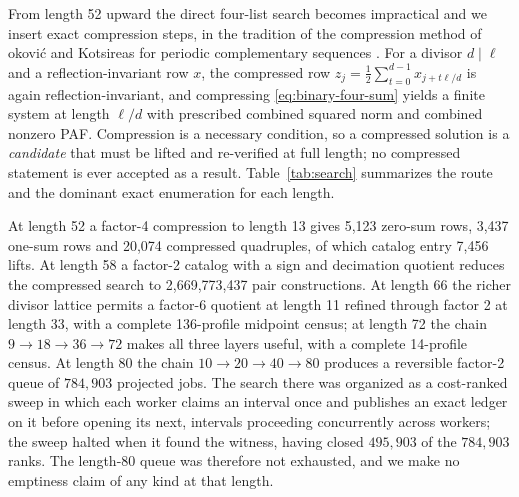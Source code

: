 \documentclass[11pt]{article}
\begin{document}
From length 52 upward the direct four-list search becomes impractical and we
insert exact compression steps, in the tradition of the compression method of
{\DJ}okovi{\'c} and Kotsireas for periodic complementary sequences
\cite{dokovic-kotsireas-2015}.  For a divisor $d\mid\ell$ and a
reflection-invariant row $x$, the compressed row
$z_j=\tfrac12\sum_{t=0}^{d-1}x_{j+t\ell/d}$ is again reflection-invariant,
and compressing \eqref{eq:binary-four-sum} yields a finite system at length
$\ell/d$ with prescribed combined squared norm and combined nonzero PAF.
Compression is a necessary condition, so a compressed solution is a
\emph{candidate} that must be lifted and re-verified at full length; no
compressed statement is ever accepted as a result.
Table~\ref{tab:search} summarizes the route and the dominant exact
enumeration for each length.

At length 52 a factor-4 compression to length 13 gives 5,123 zero-sum rows,
3,437 one-sum rows and 20,074 compressed quadruples, of which catalog entry
7,456 lifts.  At length 58 a factor-2 catalog with a sign and decimation
quotient reduces the compressed search to 2,669,773,437 pair constructions.
At length 66 the richer divisor lattice permits a factor-6 quotient at length
11 refined through factor 2 at length 33, with a complete 136-profile
midpoint census; at length 72 the chain $9\to18\to36\to72$ makes all three
layers useful, with a complete 14-profile census.  At length 80 the chain
$10\to20\to40\to80$ produces a reversible factor-2 queue of $784{,}903$
projected jobs.  The search there was organized as a cost-ranked sweep in
which each worker claims an interval once and publishes an exact ledger on it
before opening its next, intervals proceeding concurrently across workers; the
sweep halted when it found the witness, having closed $495{,}903$ of
the $784{,}903$ ranks.  The length-80 queue was therefore not exhausted, and
we make no emptiness claim of any kind at that length.
\end{document}
